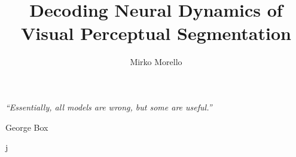 \documentclass[utf8]{styles/tthesis}
\title{Decoding Neural Dynamics of Visual Perceptual Segmentation}
\author{Mirko Morello}
\begin{document}


\printfrontpage




\chapter*{\mbox{}}

\begin{flushright}
\thispagestyle{empty}
\null{}
{\it ``Essentially, all models are wrong, but some are useful.''

\vspace{10pt}
George Box
}
\null
\end{flushright}
%
\thispagestyle{empty}
\mbox{}
\newpage


 j


\tableofcontents
\listoffigures
\listoftables

\mainmatter











\label{Bibliography}


\end{document}
